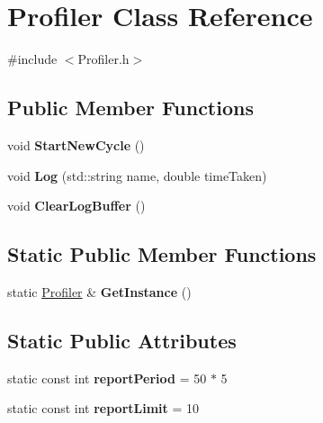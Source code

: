 \hypertarget{class_profiler}{
\section{\-Profiler \-Class \-Reference}
\label{class_profiler}
}


{\ttfamily \#include $<$\-Profiler.\-h$>$}

\subsection*{\-Public \-Member \-Functions}
\begin{DoxyCompactItemize}
\item 
\hypertarget{class_profiler_a5953010288cfb36c95e84f0370411cbc}{
void {\bfseries \-Start\-New\-Cycle} ()}
\label{class_profiler_a5953010288cfb36c95e84f0370411cbc}

\item 
\hypertarget{class_profiler_a9baecdda5cc00bd43d6196105d34ce32}{
void {\bfseries \-Log} (std\-::string name, double time\-Taken)}
\label{class_profiler_a9baecdda5cc00bd43d6196105d34ce32}

\item 
\hypertarget{class_profiler_afea0a7425697009c14fb240ada89a37b}{
void {\bfseries \-Clear\-Log\-Buffer} ()}
\label{class_profiler_afea0a7425697009c14fb240ada89a37b}

\end{DoxyCompactItemize}
\subsection*{\-Static \-Public \-Member \-Functions}
\begin{DoxyCompactItemize}
\item 
\hypertarget{class_profiler_a97ff2f7bcb63ca90750389049f7038a3}{
static \hyperlink{class_profiler}{\-Profiler} \& {\bfseries \-Get\-Instance} ()}
\label{class_profiler_a97ff2f7bcb63ca90750389049f7038a3}

\end{DoxyCompactItemize}
\subsection*{\-Static \-Public \-Attributes}
\begin{DoxyCompactItemize}
\item 
\hypertarget{class_profiler_a7c1def2ecb10a5400799769ae2c5b6eb}{
static const int {\bfseries report\-Period} = 50 $\ast$ 5}
\label{class_profiler_a7c1def2ecb10a5400799769ae2c5b6eb}

\item 
\hypertarget{class_profiler_a28a468656e52f8bbeaf2a76c07ecdac2}{
static const int {\bfseries report\-Limit} = 10}
\label{class_profiler_a28a468656e52f8bbeaf2a76c07ecdac2}

\end{DoxyCompactItemize}
